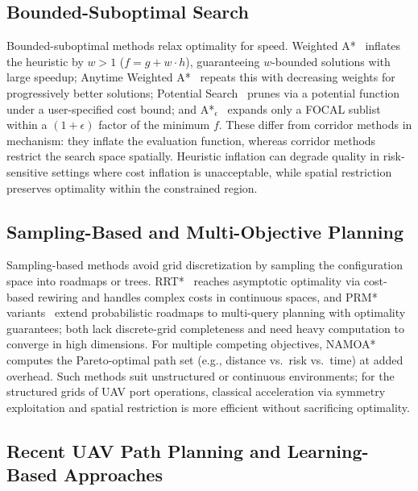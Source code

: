\documentclass[preprint,12pt,authoryear]{elsarticle}
\begin{document}
\subsection{Bounded-Suboptimal Search}\label{subsec:bounded}

Bounded-suboptimal methods relax optimality for speed. Weighted A*~\citep{Pohl1970} inflates the heuristic by $w>1$ ($f = g + w \cdot h$), guaranteeing $w$-bounded solutions with large speedup; Anytime Weighted A*~\citep{Hansen2007} repeats this with decreasing weights for progressively better solutions; Potential Search~\citep{Stern2014} prunes via a potential function under a user-specified cost bound; and A*$_\epsilon$~\citep{Pearl1982} expands only a FOCAL sublist within a $(1+\epsilon)$ factor of the minimum $f$. These differ from corridor methods in mechanism: they inflate the evaluation function, whereas corridor methods restrict the search space spatially. Heuristic inflation can degrade quality in risk-sensitive settings where cost inflation is unacceptable, while spatial restriction preserves optimality within the constrained region.

\subsection{Sampling-Based and Multi-Objective Planning}\label{subsec:sampling}

Sampling-based methods avoid grid discretization by sampling the configuration space into roadmaps or trees. RRT*~\citep{Karaman2011} reaches asymptotic optimality via cost-based rewiring and handles complex costs in continuous spaces, and PRM* variants~\citep{Karaman2011} extend probabilistic roadmaps to multi-query planning with optimality guarantees; both lack discrete-grid completeness and need heavy computation to converge in high dimensions. For multiple competing objectives, NAMOA*~\citep{Mandow2010} computes the Pareto-optimal path set (e.g., distance vs.\ risk vs.\ time) at added overhead. Such methods suit unstructured or continuous environments; for the structured grids of UAV port operations, classical acceleration via symmetry exploitation and spatial restriction is more efficient without sacrificing optimality.

\subsection{Recent UAV Path Planning and Learning-Based Approaches}\label{subsec:uav_learning}
\end{document}
